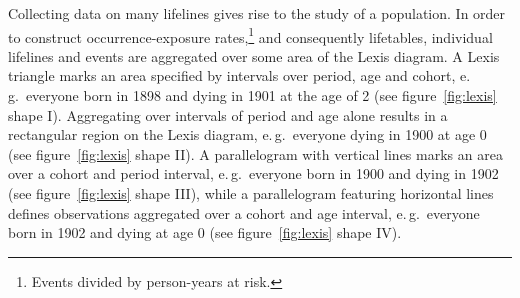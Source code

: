 \documentclass[parskip=half]{scrartcl}
\begin{document}
Collecting data on many lifelines gives rise to the study of a population. In order to construct occurrence-exposure rates,\footnote{
Events divided by person-years at risk.
}
and consequently lifetables, individual lifelines and events are aggregated over some area of the Lexis diagram. A Lexis triangle marks an area specified by intervals over period, age and cohort, e.\,g.~everyone born in 1898 and dying in 1901 at the age of 2 (see figure~\ref{fig:lexis} shape I). Aggregating over intervals of period and age alone results in a rectangular region on the Lexis diagram, e.\,g.~everyone dying in 1900 at age 0 (see figure~\ref{fig:lexis} shape II). A parallelogram with vertical lines marks an area over a cohort and period interval, e.\,g.~everyone born in 1900 and dying in 1902 (see figure~\ref{fig:lexis} shape III), while a parallelogram featuring horizontal lines defines observations aggregated over a cohort and age interval, e.\,g.~everyone born in 1902 and dying at age 0 (see figure~\ref{fig:lexis} shape IV).
\end{document}
